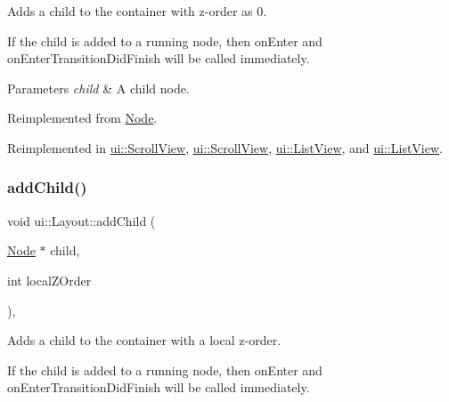 Adds a child to the container with z-\/order as 0.

If the child is added to a \textquotesingle{}running\textquotesingle{} node, then \textquotesingle{}on\+Enter\textquotesingle{} and \textquotesingle{}on\+Enter\+Transition\+Did\+Finish\textquotesingle{} will be called immediately.


\begin{DoxyParams}{Parameters}
{\em child} & A child node. \\
\hline
\end{DoxyParams}


Reimplemented from \hyperlink{classNode_a132699398b350e83b548a5645e69beb0}{Node}.



Reimplemented in \hyperlink{classui_1_1ScrollView_a33a556579ca4e24b016a787af18cfcae}{ui\+::\+Scroll\+View}, \hyperlink{classui_1_1ScrollView_a6cdee934880e71245c6f5e6a2789c48a}{ui\+::\+Scroll\+View}, \hyperlink{classui_1_1ListView_a7fb7f42f3f3ee9e9ca8ee3bb959e2c32}{ui\+::\+List\+View}, and \hyperlink{classui_1_1ListView_aeee2116f21f0e89de5a2e1b9cc93e012}{ui\+::\+List\+View}.

\mbox{\label{classui_1_1Layout_a0ba6f93abe0d74d31d08147339952e19}} 
\subsubsection{\texorpdfstring{add\+Child()}{addChild()}\hspace{0.1cm}{\footnotesize\ttfamily [2/8]}}
{\footnotesize\ttfamily void ui\+::\+Layout\+::add\+Child (\begin{DoxyParamCaption}\item[{\hyperlink{classNode}{Node} $\ast$}]{child,  }\item[{int}]{local\+Z\+Order }\end{DoxyParamCaption})\hspace{0.3cm}{\ttfamily [override]}, {\ttfamily [virtual]}}

Adds a child to the container with a local z-\/order.

If the child is added to a \textquotesingle{}running\textquotesingle{} node, then \textquotesingle{}on\+Enter\textquotesingle{} and \textquotesingle{}on\+Enter\+Transition\+Did\+Finish\textquotesingle{} will be called immediately.


